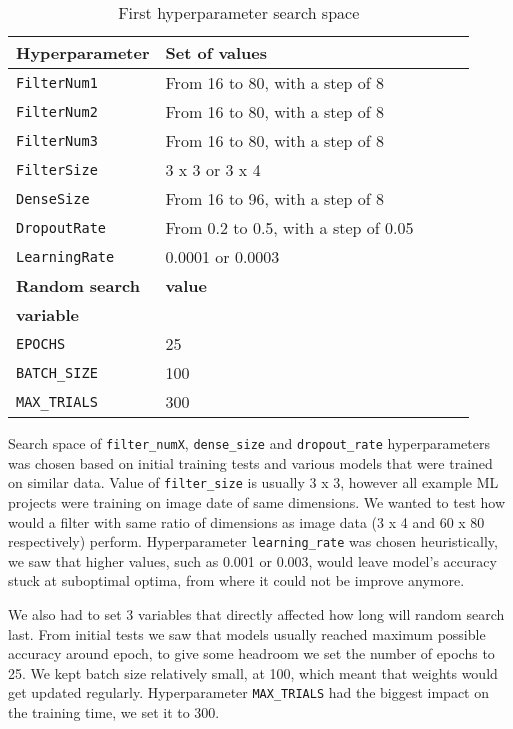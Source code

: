\begin{table}
    \centering
    \begin{tabular}{@{} *5l @{}}    \toprule
        \textbf{Hyperparameter} & \textbf{Set of values}\\\midrule
        \verb|FilterNum1|       & From 16 to 80, with a step of 8\\ 
        \verb|FilterNum2|       & From 16 to 80, with a step of 8\\ 
        \verb|FilterNum3|       & From 16 to 80, with a step of 8\\
        \verb|FilterSize|       & 3 x 3 or 3 x 4\\
        \verb|DenseSize|        & From 16 to 96, with a step of 8\\
        \verb|DropoutRate|      & From 0.2 to 0.5, with a step of 0.05\\
        \verb|LearningRate|     & 0.0001 or 0.0003\\\toprule
        \textbf{Random search}  & \textbf{value}\\
        \textbf{variable}       & \\\midrule
        \verb|EPOCHS|           & 25\\
        \verb|BATCH_SIZE|       & 100\\
        \verb|MAX_TRIALS|       & 300\\\bottomrule
    \end{tabular}
    \caption{ First hyperparameter search space}
    \label{hyper_table1}
\end{table}

Search space of \verb|filter_numX|, \verb|dense_size| and \verb|dropout_rate| hyperparameters was chosen based on initial training tests and various models that were trained on similar data.
Value of \verb|filter_size| is usually 3 x 3, however all example ML projects were training on image date of same dimensions.
We wanted to test how would a filter with same ratio of dimensions as image data (3 x 4 and 60 x 80 respectively) perform.
Hyperparameter \verb|learning_rate| was chosen heuristically, we saw that higher values, such as 0.001 or 0.003, would leave model's accuracy stuck at suboptimal optima, from where it could not be improve anymore.

We also had to set 3 variables that directly affected how long will random search last.
From initial tests we saw that models usually reached maximum possible accuracy around  epoch, to give some headroom we set the number of epochs to 25.
We kept batch size relatively small, at 100, which meant that weights would get updated regularly.
Hyperparameter \verb|MAX_TRIALS| had the biggest impact on the training time, we set it to 300.

